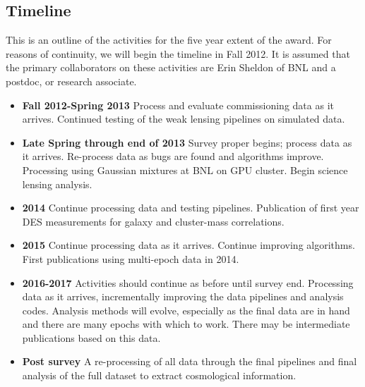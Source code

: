 \documentclass[12pt]{article}
\begin{document}
\subsection{Timeline} \label{sec:timeline}

This is an outline of the activities for the five year extent of the award.
For reasons of continuity, we will begin the timeline in Fall 2012.  It is
assumed that the primary collaborators on these activities are Erin Sheldon of
BNL and a postdoc, or research associate.

\begin{itemize}

\item {\bf Fall 2012-Spring 2013} Process and evaluate commissioning data as it
    arrives.  Continued testing of the weak lensing pipelines on simulated
    data.

\item {\bf Late Spring through end of 2013} Survey proper begins; process data
    as it arrives.  Re-process data as bugs are found and algorithms improve.
    Processing using Gaussian mixtures at BNL on GPU cluster.  Begin science
    lensing analysis.

\item {\bf 2014} Continue processing data and testing pipelines.  Publication
    of first year DES measurements for galaxy and cluster-mass correlations.

\item {\bf 2015} Continue processing data as it arrives.  Continue improving
    algorithms.   First publications using multi-epoch data in 2014.

\item {\bf 2016-2017}  Activities should continue as before until survey end.
    Processing data as it arrives, incrementally improving the data pipelines
    and analysis codes.  Analysis methods will evolve, especially as the final
    data are in hand and there are many epochs with which to work.   There may
    be intermediate publications based on this data.

\item {\bf Post survey} A re-processing of all data through the final pipelines
    and final analysis of the full dataset to extract cosmological information.


\end{itemize}
\end{document}
